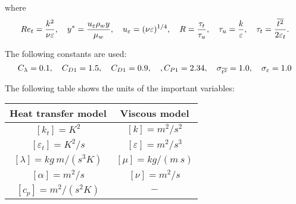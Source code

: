 where
\begin{equation}
Re_t = \frac{k^2}{\nu\varepsilon}, \quad y^*= \frac{u_\varepsilon \rho_w y}{\mu_w}, \quad u_\varepsilon = (\nu\varepsilon)^{1/4}, \quad R = \frac{\tau_t}{\tau_u}, \quad \tau_u = \frac{k}{{\varepsilon}}, \quad \tau_t = \frac{\overline{t^2}}{2{\varepsilon}_t}.
\end{equation}

The following constants are used:
\begin{equation}
C_\lambda=0.1, \quad C_{D1}=1.5, \quad C_{D1}=0.9, \quad, C_{P1}=2.34, \quad \sigma_{\overline{t^2}}=1.0, \quad \sigma_{{\varepsilon}}=1.0
\end{equation}


The following table shows the units of the important variables: 
\begin{center}
\begin{tabular}{ c | c }
 Heat transfer model & Viscous model   \\ \hline
 $\left[k_t\right]= K^2$ & $\left[k\right]= m^2 / s^2$  \\
  $\left[\varepsilon_t\right]= K^2/s$ & $\left[\varepsilon\right]= m^2 / s^3$  \\ 
  $\left[\lambda\right]= kg \ m / (s^3 K)$ & $\left[\mu\right]= kg /(m \ s)$  \\
    $\left[\alpha\right]= m^2 /s $ & $\left[\nu\right]= m^2 /s$  \\ 
        $\left[c_p\right]= m^2 /(s^2 K) $ & $-$  \\ \hline
\end{tabular}
\end{center}
